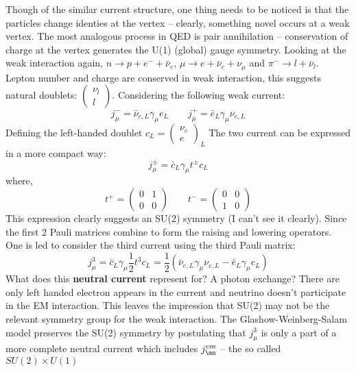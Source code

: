 Though of the similar current structure, one thing needs to be noticed is that
the particles change identies at the vertex -- clearly, something novel occurs 
at a weak vertex. The most analogous process in QED is pair annihilation -- 
conservation of charge at the vertex generates the U(1) (global) gauge symmetry.
Looking at the weak interaction again, $n \rightarrow p + e^- + \bar{\nu}_e$, 
$\mu \rightarrow e + \bar{\nu}_e + \nu_\mu$ and $\pi^- \rightarrow l + \bar{\nu}_l$.
Lepton number and charge are conserved in weak interaction, this suggests natural
doublets: $\begin{pmatrix} \nu_l \\ l \end{pmatrix}$. Considering the following 
weak current:
$$ j_\mu^- = \bar{\nu}_{e,L} \gamma_\mu e_L	\qquad j_\mu^+ = \bar{e}_L \gamma_\mu \nu_{e,L} $$
Defining the left-handed doublet $ c_L = \left.\begin{pmatrix} \nu_e	\\ e \end{pmatrix}\right._L $
The two current can be expressed in a more compact way:
$$ j^\pm_\mu = \bar{c}_L \gamma_\mu t^\pm c_L $$
where,
$$ t^+ = \begin{pmatrix} 0  & 1	\\ 0	& 0 \end{pmatrix}   \qquad 
t^- = \begin{pmatrix} 0  & 0	\\ 1	& 0 \end{pmatrix} $$
This expression clearly suggests an SU(2) symmetry (I can't see it clearly). 
Since the first 2 Pauli matrices combine to form the raising and lowering operators.
One is led to consider the third current using the third Pauli matrix:
$$ j_\mu^3 = \bar{c}_L \gamma_\mu \frac{1}{2}t^3 c_L 
    = \frac{1}{2}(\bar{\nu}_{e,L}\gamma_\mu \nu_{e,L} - \bar{e}_L \gamma_\mu e_L) $$
What does this \textbf{neutral current} represent for? A photon exchange? There
are only left handed electron appears in the current and neutrino doesn't 
participate in the EM interaction. This leaves the impression that SU(2) may
not be the relevant symmetry group for the weak interaction. The 
Glashow-Weinberg-Salam model preserves the SU(2) symmetry by postulating that
$j_\mu^3$ is only a part of a more complete neutral current which includes $j_\mn^{em}$ --
the so called $SU(2) \times U(1)$


